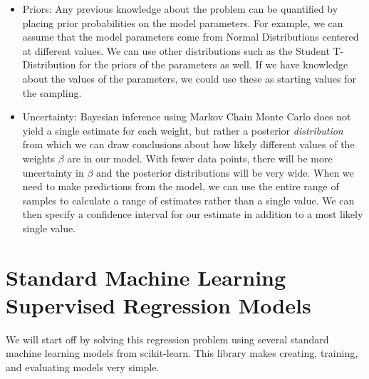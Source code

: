 \documentclass[12pt]{article}
\providecommand{\tightlist}{%
      \setlength{\itemsep}{0pt}\setlength{\parskip}{0pt}}
\begin{document}
\begin{itemize}
\tightlist
\item
  Priors: Any previous knowledge about the problem can be quantified by
  placing prior probabilities on the model parameters. For example, we
  can assume that the model parameters come from Normal Distributions
  centered at different values. We can use other distributions such as
  the Student T-Distribution for the priors of the parameters as well.
  If we have knowledge about the values of the parameters, we could use
  these as starting values for the sampling.
\item
  Uncertainty: Bayesian inference using Markov Chain Monte Carlo does
  not yield a single estimate for each weight, but rather a posterior
  \emph{distribution} from which we can draw conclusions about how
  likely different values of the weights \(\beta\) are in our model.
  With fewer data points, there will be more uncertainty in \(\beta\)
  and the posterior distributions will be very wide. When we need to
  make predictions from the model, we can use the entire range of
  samples to calculate a range of estimates rather than a single value.
  We can then specify a confidence interval for our estimate in addition
  to a most likely single value.
\end{itemize}

    \hypertarget{standard-machine-learning-supervised-regression-models}{%
\section{Standard Machine Learning Supervised Regression
Models}\label{standard-machine-learning-supervised-regression-models}}

We will start off by solving this regression problem using several
standard machine learning models from scikit-learn. This library makes
creating, training, and evaluating models very simple.
\end{document}
